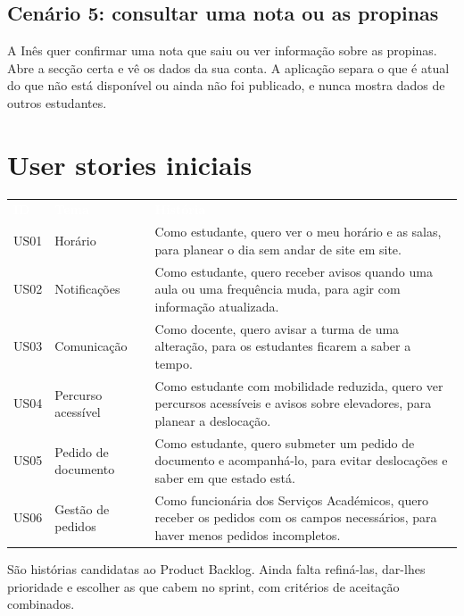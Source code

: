 \documentclass[11pt,a4paper]{article}
\newcommand{\th}[1]{\textcolor{white}{\sffamily\bfseries #1}}
\begin{document}
\subsection{Cenário 5: consultar uma nota ou as propinas}

A Inês quer confirmar uma nota que saiu ou ver informação sobre as propinas. Abre a secção certa e vê os dados da sua conta. A aplicação separa o que é atual do que não está disponível ou ainda não foi publicado, e nunca mostra dados de outros estudantes.

\section{User stories iniciais}

\small
\renewcommand{\arraystretch}{1.5}
\begin{tabularx}{\textwidth}{N{1.3cm} L{3.0cm} Y}
   \th{ID} & \th{Tema} & \th{História} \\
  US01 & Horário &
    Como estudante, quero ver o meu horário e as salas, para planear o dia sem andar de site em site. \\
  US02 & Notificações &
    Como estudante, quero receber avisos quando uma aula ou uma frequência muda, para agir com informação atualizada. \\
  US03 & Comunicação &
    Como docente, quero avisar a turma de uma alteração, para os estudantes ficarem a saber a tempo. \\
  US04 & Percurso acessível &
    Como estudante com mobilidade reduzida, quero ver percursos acessíveis e avisos sobre elevadores, para planear a deslocação. \\
  US05 & Pedido de documento &
    Como estudante, quero submeter um pedido de documento e acompanhá-lo, para evitar deslocações e saber em que estado está. \\
  US06 & Gestão de pedidos &
    Como funcionária dos Serviços Académicos, quero receber os pedidos com os campos necessários, para haver menos pedidos incompletos. \\
  \bottomrule
\end{tabularx}
\renewcommand{\arraystretch}{1}
\normalsize

São histórias candidatas ao Product Backlog. Ainda falta refiná-las, dar-lhes prioridade e escolher as que cabem no sprint, com critérios de aceitação combinados.
\end{document}
